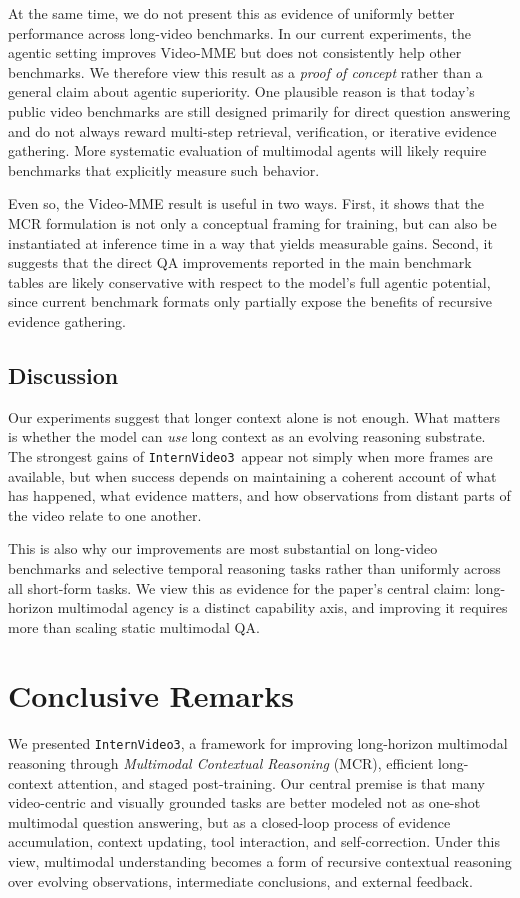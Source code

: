 \documentclass[11pt, letterpaper]{template}
\theoremstyle{plain}
\theoremstyle{definition}
\theoremstyle{remark}
\newcommand{\name}{\texttt{InternVideo3}\xspace}
\begin{document}
At the same time, we do not present this as evidence of uniformly better performance across long-video benchmarks. In our current experiments, the agentic setting improves Video-MME but does not consistently help other benchmarks. We therefore view this result as a \emph{proof of concept} rather than a general claim about agentic superiority. One plausible reason is that today's public video benchmarks are still designed primarily for direct question answering and do not always reward multi-step retrieval, verification, or iterative evidence gathering. More systematic evaluation of multimodal agents will likely require benchmarks that explicitly measure such behavior.

Even so, the Video-MME result is useful in two ways. First, it shows that the MCR formulation is not only a conceptual framing for training, but can also be instantiated at inference time in a way that yields measurable gains. Second, it suggests that the direct QA improvements reported in the main benchmark tables are likely conservative with respect to the model's full agentic potential, since current benchmark formats only partially expose the benefits of recursive evidence gathering.

\subsection{Discussion}

Our experiments suggest that longer context alone is not enough. What matters is whether the model can \emph{use} long context as an evolving reasoning substrate. The strongest gains of \name\ appear not simply when more frames are available, but when success depends on maintaining a coherent account of what has happened, what evidence matters, and how observations from distant parts of the video relate to one another.

This is also why our improvements are most substantial on long-video benchmarks and selective temporal reasoning tasks rather than uniformly across all short-form tasks. We view this as evidence for the paper's central claim: long-horizon multimodal agency is a distinct capability axis, and improving it requires more than scaling static multimodal QA.

\section{Conclusive Remarks}

We presented \name, a framework for improving long-horizon multimodal reasoning through \emph{Multimodal Contextual Reasoning} (MCR), efficient long-context attention, and staged post-training. Our central premise is that many video-centric and visually grounded tasks are better modeled not as one-shot multimodal question answering, but as a closed-loop process of evidence accumulation, context updating, tool interaction, and self-correction. Under this view, multimodal understanding becomes a form of recursive contextual reasoning over evolving observations, intermediate conclusions, and external feedback.
\end{document}
